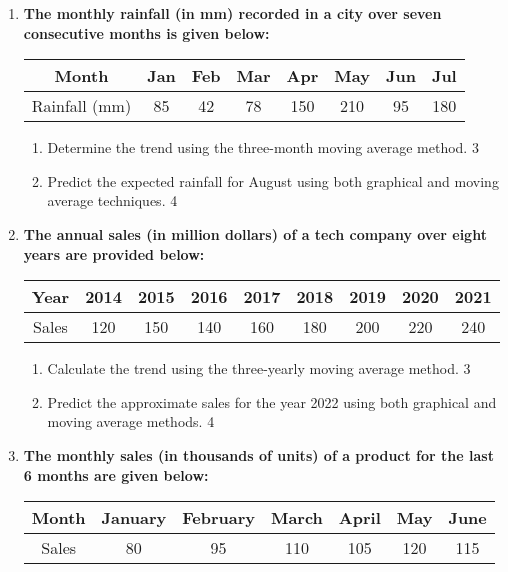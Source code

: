 \documentclass[a4paper,oneside]{book}
\begin{document}
\begin{enumerate}
\item  
\textbf{The monthly rainfall (in mm) recorded in a city over seven consecutive months is given below:}  

\begin{table}[h]  
\centering  
\begin{tabular}{cccccccc}  
Month     & Jan  & Feb  & Mar  & Apr  & May  & Jun  & Jul  \\ \hline  
Rainfall (mm) & 85   & 42   & 78   & 150  & 210  & 95   & 180    
\end{tabular}  
\end{table}  

\begin{enumerate}  
    \item  
    Determine the trend using the three-month moving average method. \hfill 3  
    \item  
    Predict the expected rainfall for August using both graphical and moving average techniques. \hfill 4  
\end{enumerate}  


\item
\textbf{The annual sales (in million dollars) of a tech company over eight years are provided below:}

\begin{table}[h]
\centering
\begin{tabular}{ccccccccc}
Year     & 2014 & 2015 & 2016 & 2017 & 2018 & 2019 & 2020 & 2021 \\ \hline
Sales    & 120  & 150  & 140  & 160  & 180  & 200  & 220  & 240   
\end{tabular}
\end{table}

\begin{enumerate}
    \item  
    Calculate the trend using the three-yearly moving average method. \hfill 3
    \item
    Predict the approximate sales for the year 2022 using both graphical and moving average methods. \hfill 4
\end{enumerate}
  
  \item
\textbf{The monthly sales (in thousands of units) of a product for the last 6 months are given below:}

\begin{table}[h]
\centering
\begin{tabular}{ccccccc}
Month     & January & February & March & April & May & June \\ \hline
Sales     & 80      & 95       & 110   & 105   & 120  & 115  \\
\end{tabular}
\end{table}


\end{enumerate}
\end{document}
